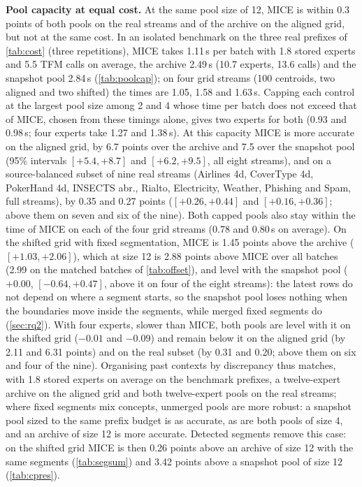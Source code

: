\documentclass[11pt]{article}
\theoremstyle{plain}
\theoremstyle{definition}
\theoremstyle{remark}
\newcommand{\method}{\textsc{MICE}}   %
\begin{document}
\textbf{Pool capacity at equal cost.} At the same pool size of 12, \method{} is within 0.3 points of both pools on the
real streams and of the archive on the aligned grid, but not at the same cost. In an isolated benchmark on the three real prefixes of \cref{tab:cost} (three repetitions), \method{} takes
1.11\,s per batch with 1.8 stored experts and 5.5 TFM calls on average, the archive 2.49\,s (10.7 experts, 13.6
calls) and the snapshot pool 2.84\,s (\cref{tab:poolcap}); on four grid streams (100 centroids, two aligned and two shifted) the times are
1.05, 1.58 and 1.63\,s.
Capping each control at the largest pool size among 2 and 4 whose time per batch does not exceed that of \method{},
chosen from these timings alone, gives two experts for both (0.93 and 0.98\,s; four experts take 1.27 and 1.38\,s).
At this capacity \method{} is more accurate on the aligned grid, by 6.7 points over the archive and 7.5 over the
snapshot pool (95\% intervals $[+5.4,+8.7]$ and $[+6.2,+9.5]$, all eight streams), and on a source-balanced subset of
nine real streams (Airlines 4d, CoverType 4d, PokerHand 4d, INSECTS abr., Rialto, Electricity, Weather, Phishing and
Spam, full streams), by 0.35 and 0.27 points ($[+0.26,+0.44]$ and $[+0.16,+0.36]$; above them on seven and six of
the nine). Both capped pools also stay within the time of \method{} on
each of the four grid streams (0.78 and 0.80\,s on average). On the shifted grid with fixed segmentation, \method{} is 1.45 points above the
archive ($[+1.03,+2.06]$), which at size 12 is 2.88 points above \method{} over all batches
(2.99 on the matched batches of \cref{tab:offset}), and level with the snapshot pool ($+0.00$, $[-0.64,+0.47]$, above it on four of
the eight streams): the latest rows do not depend on where a segment starts, so the snapshot pool loses nothing when
the boundaries move inside the segments, while merged fixed segments do (\cref{sec:rq2}). With four
experts, slower than \method{}, both pools are level with it on the shifted grid ($-0.01$ and $-0.09$) and remain
below it on the aligned grid (by 2.11 and 6.31 points) and on the real subset (by 0.31 and 0.20; above them on six
and four of the nine). Organising past
contexts by discrepancy thus matches, with 1.8 stored experts on average on the benchmark prefixes, a twelve-expert archive on the aligned grid and
both twelve-expert pools on the real streams; where fixed segments mix concepts, unmerged pools are more robust: a
snapshot pool sized to the same prefix budget is as accurate, as are both pools of size 4, and an archive of size 12
is more accurate. Detected segments remove this case: on the shifted grid \method{} is then 0.26 points above an
archive of size 12 with the same segments (\cref{tab:segsum}) and 3.42 points above a snapshot pool of size 12
(\cref{tab:cpres}).
\end{document}
